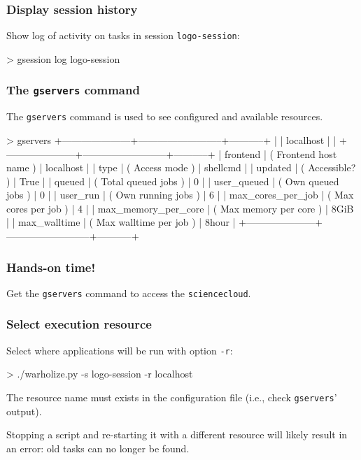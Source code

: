 \documentclass[english,serif,mathserif,usenames,dvipsnames]{beamer}
\begin{document}
\begin{frame}
  \frametitle{Display session history}

  Show log of activity on tasks in session \texttt{logo-session}:
\begin{semiverbatim}
    > gsession log logo-session
\end{semiverbatim}
\end{frame}


\begin{frame}[fragile]
  \frametitle{The \texttt{gservers} command}

  The \texttt{gservers} command is used to see \alert<2>{configured} and
  available resources.

\+
\begin{stdout}
> gservers
+---------------------+--------------------------+-----------+
|                     | localhost                |           |
+---------------------+--------------------------+-----------+
|            frontend | ( Frontend host name )   | localhost |
|                type | ( Access mode )          | shellcmd  |
|             updated | ( Accessible? )          | True      |
|              queued | ( Total queued jobs )    | 0         |
|         user_queued | ( Own queued jobs )      | 0         |
|            user_run | ( Own running jobs )     | 6         |
|   max_cores_per_job | ( Max cores per job )    | 4         |
| max_memory_per_core | ( Max memory per core )  | 8GiB      |
|        max_walltime | ( Max walltime per job ) | 8hour     |
+---------------------+--------------------------+-----------+
\end{stdout}


  \+
  \begin{flushright}
    \hyperlink{resources}{}
  \end{flushright}
\end{frame}


\begin{frame}
  \frametitle{Hands-on time!}
  \begin{exercise}
    Get the \texttt{gservers} command to access the \texttt{sciencecloud}.
  \end{exercise}
\end{frame}


\begin{frame}
  \frametitle{Select execution resource}

  Select where applications will be run with option \texttt{-r}:
\begin{semiverbatim}
    > ./warholize.py -s logo-session -r localhost
\end{semiverbatim}

  \+ The resource name must exists in the configuration file (i.e.,
  check \texttt{gservers}' output).

  \+ Stopping a script and re-starting it with a different resource
  will likely result in an error: old tasks can no longer be found.
\end{frame}
\end{document}
